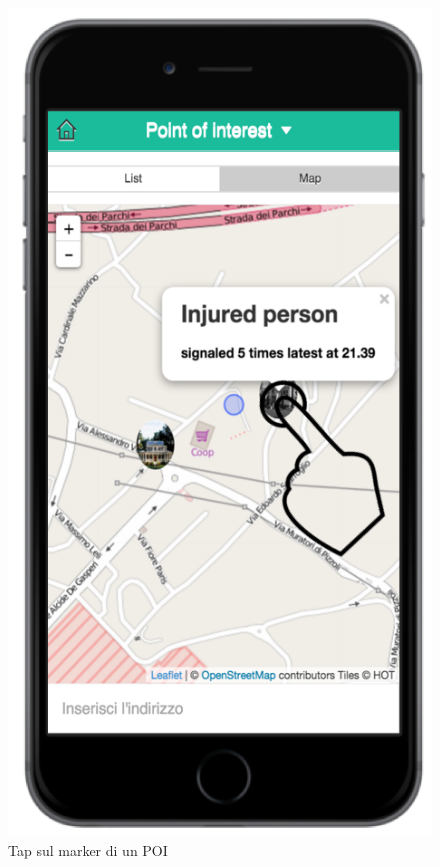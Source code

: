 \begin{itemize}
\begin{figure}[H]
	\includegraphics[scale=1]{interfaccia/tappoimarker.png}
	\caption{Tap sul marker di un POI }
	\label{fig:poilist}
\end{figure}
\newpage
\end{itemize}